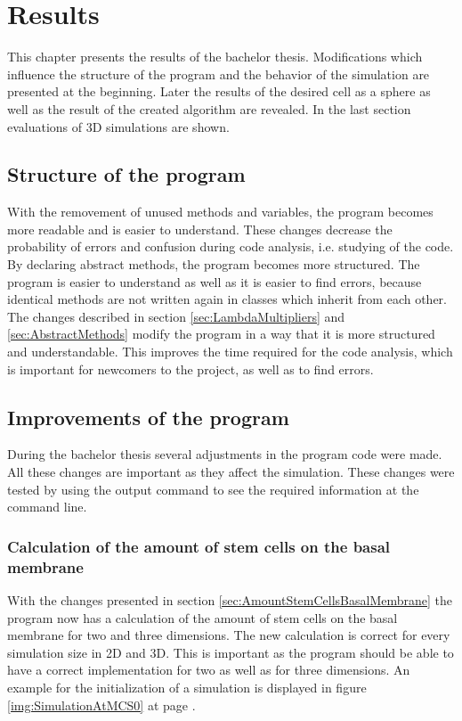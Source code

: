 \chapter{Results}
This chapter presents the results of the bachelor thesis. Modifications which influence the structure of the program and the behavior of the simulation are presented at the beginning. Later the results of the desired cell as a sphere as well as the result of the created algorithm are revealed. In the last section evaluations of 3D simulations are shown.

\section{Structure of the program}
With the removement of unused methods and variables, the program becomes more readable and is easier to understand. These changes decrease the probability of errors and confusion during code analysis, i.e. studying of the code. By declaring abstract methods, the program becomes more structured. The program is easier to understand as well as it is easier to find errors, because identical methods are not written again in classes which inherit from each other. \newline
The changes described in section \ref{sec:LambdaMultipliers} and \ref{sec:AbstractMethods} modify the program in a way that it is more structured and understandable. This improves the time required for the code analysis, which is important for newcomers to the project, as well as to find errors.


\section{Improvements of the program}
During the bachelor thesis several adjustments in the program code were made. All these changes are important as they affect the simulation. These changes were tested by using the output command to see the required information at the command line. 
\subsection{Calculation of the amount of stem cells on the basal membrane}
With the changes presented in section \ref{sec:AmountStemCellsBasalMembrane} the program now has a calculation of the amount of stem cells on the basal membrane for two and three dimensions. The new calculation is correct for every simulation size in 2D and 3D. This is important as the program should be able to have a correct implementation for two as well as for three dimensions. An example for the initialization of a simulation is displayed in figure \ref{img:SimulationAtMCS0} at page \pageref{img:SimulationAtMCS0}.




